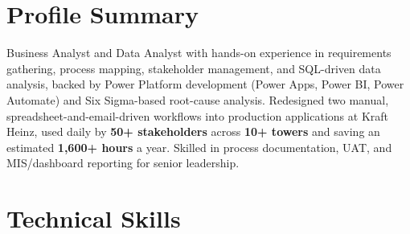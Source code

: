 \documentclass[letterpaper,10pt]{article}
\begin{document}
\section{Profile Summary}
\vspace{-2pt}
\footnotesize
Business Analyst and Data Analyst with hands-on experience in requirements gathering, process mapping, stakeholder management, and SQL-driven data analysis, backed by Power Platform development (Power Apps, Power BI, Power Automate) and Six Sigma-based root-cause analysis. Redesigned two manual, spreadsheet-and-email-driven workflows into production applications at Kraft Heinz, used daily by \textbf{50+ stakeholders} across \textbf{10+ towers} and saving an estimated \textbf{1,600+ hours} a year. Skilled in process documentation, UAT, and MIS/dashboard reporting for senior leadership.
\normalsize

\vspace{-0.5em}
\section{Technical Skills}

\vspace{-0.5em}
\end{document}
